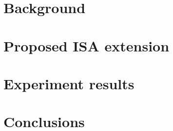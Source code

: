 \documentclass[sigconf]{acmart}
\begin{document}
\section{Background}


\section{Proposed ISA extension}

\section{Experiment results}

\section{Conclusions}





\end{document}
